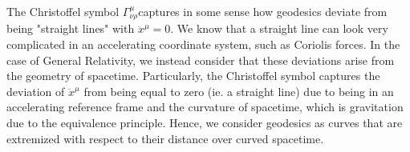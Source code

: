 \documentclass{article}
\begin{document}
 			\vspace{0.5cm}
 			The Christoffel symbol $\Gamma_{\nu\rho}^\mu$captures in some sense how geodesics deviate from being "straight lines" with $\ddot{x}^\mu = 0$. We know that a straight line can look very complicated in an accelerating coordinate system, such as Coriolis forces. In the case of General Relativity, we instead consider that these deviations arise from the geometry of spacetime. Particularly, the Christoffel symbol captures the deviation of $\ddot{x}^\mu$ from being equal to zero (ie. a straight line) due to being in an accelerating reference frame and the curvature of spacetime, which is gravitation due to the equivalence principle. Hence, we consider geodesics as curves that are extremized with respect to their distance over curved spacetime.
 			
 			\pagebreak
 			
\end{document}
